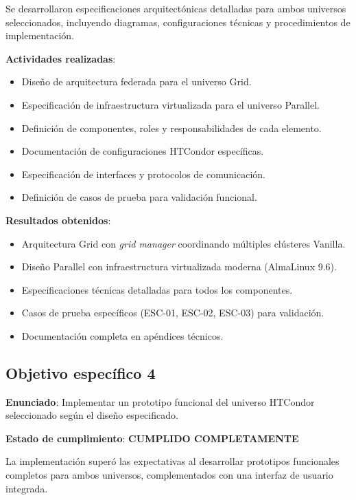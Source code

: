 Se desarrollaron especificaciones arquitectónicas detalladas para ambos universos seleccionados, incluyendo diagramas, configuraciones técnicas y procedimientos de implementación.

\textbf{Actividades realizadas}:
\begin{itemize}
    \item Diseño de arquitectura federada para el universo Grid.
    \item Especificación de infraestructura virtualizada para el universo Parallel.
    \item Definición de componentes, roles y responsabilidades de cada elemento.
    \item Documentación de configuraciones HTCondor específicas.
    \item Especificación de interfaces y protocolos de comunicación.
    \item Definición de casos de prueba para validación funcional.
\end{itemize}

\textbf{Resultados obtenidos}:
\begin{itemize}
    \item Arquitectura Grid con \textit{grid manager} coordinando múltiples clústeres Vanilla.
    \item Diseño Parallel con infraestructura virtualizada moderna (AlmaLinux 9.6).
    \item Especificaciones técnicas detalladas para todos los componentes.
    \item Casos de prueba específicos (ESC-01, ESC-02, ESC-03) para validación.
    \item Documentación completa en apéndices técnicos.
\end{itemize}

\subsection{Objetivo específico 4}
\noindent

\textbf{Enunciado}: Implementar un prototipo funcional del universo HTCondor seleccionado según el diseño especificado.

\textbf{Estado de cumplimiento}: \textbf{CUMPLIDO COMPLETAMENTE}

La implementación superó las expectativas al desarrollar prototipos funcionales completos para ambos universos, complementados con una interfaz de usuario integrada.

